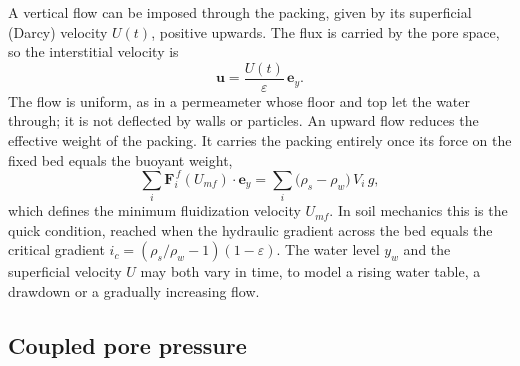 A vertical flow can be imposed through the packing, given by its superficial
(Darcy) velocity $U(t)$, positive upwards.  The flux is carried by the pore
space, so the interstitial velocity is
\begin{equation}
  \mathbf{u} = \frac{U(t)}{\varepsilon}\,\mathbf{e}_{y}.
  \label{eq:interstitial}
\end{equation}
The flow is uniform, as in a permeameter whose floor and top let the water
through; it is not deflected by walls or particles.  An upward flow reduces the
effective weight of the packing.  It carries the packing entirely once its force
on the fixed bed equals the buoyant weight,
\begin{equation}
  \sum_{i}\mathbf{F}_{i}^{\,f}(U_{mf})\cdot\mathbf{e}_{y}
  = \sum_{i}\bigl(\rho_{s}-\rho_{w}\bigr)\,V_{i}\,g ,
  \label{eq:umf}
\end{equation}
which defines the minimum fluidization velocity $U_{mf}$.  In soil mechanics this
is the quick condition, reached when the hydraulic gradient across the bed
equals the critical gradient $i_{c}=(\rho_{s}/\rho_{w}-1)(1-\varepsilon)$.  The
water level $y_{w}$ and the superficial velocity $U$ may both vary in time, to
model a rising water table, a drawdown or a gradually increasing flow.

\subsection{Coupled pore pressure}
\label{sec:coupled-water}

